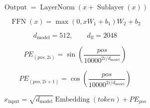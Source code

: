 \[
\operatorname{Output}
=
\operatorname{LayerNorm}\left(x+\operatorname{Sublayer}(x)\right)
\]

\[
\operatorname{FFN}(x)
=
\max(0,xW_1+b_1)W_2+b_2
\]

\[
d_{\text{model}}=512,\qquad
d_{\text{ff}}=2048
\]

\[
PE_{(pos,2i)}
=
\sin\left(\frac{pos}{10000^{2i/d_{\text{model}}}}\right)
\]

\[
PE_{(pos,2i+1)}
=
\cos\left(\frac{pos}{10000^{2i/d_{\text{model}}}}\right)
\]

\[
x_{\text{input}}
=
\sqrt{d_{\text{model}}}\operatorname{Embedding}(token)+PE_{pos}
\]
